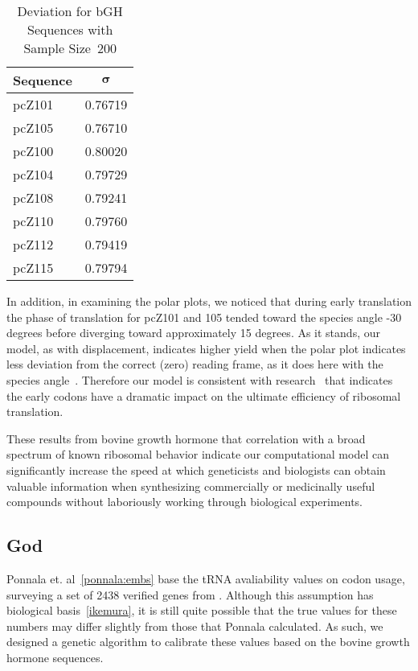 \documentclass[12pt, draft]{article}
\numberwithin{equation}{section}
\begin{document}
\begin{table}[tbp]
\begin{center}
    \begin{tabular}{lc}
        \toprule
        \textbf{Sequence} & $\mathbf{\sigma}$\\
        \midrule
        pcZ101 & 0.76719\\
        pcZ105 & 0.76710\\
        \midrule
        pcZ100 & 0.80020\\
        pcZ104 & 0.79729\\
        pcZ108 & 0.79241\\
        pcZ110 & 0.79760\\
        pcZ112 & 0.79419\\
        pcZ115 & 0.79794\\
        \bottomrule
    \end{tabular}
    \caption{Deviation for bGH Sequences with Sample Size~200}
    \label{bgh:deviation}
\end{center}
\end{table}

In addition, in examining the polar plots, we noticed that during
early translation the phase of translation for pcZ101 and 105 tended toward the species
angle -30 degrees before diverging toward approximately 15 degrees. As
it stands, our model, as with displacement, indicates higher yield when the polar plot
indicates less deviation from the correct (zero) reading frame, as it
does here with the species angle~\cite{lalit:mechanics}. Therefore our
model is consistent with research~\cite{bgh:initiation} that indicates
the early codons have a dramatic impact on the ultimate efficiency of
ribosomal translation.

These results from bovine growth hormone that correlation with a broad
spectrum of known ribosomal behavior indicate our computational model
can significantly increase the speed at which geneticists and
biologists can obtain valuable information when synthesizing
commercially or medicinally useful compounds without laboriously
working through biological experiments.

\subsection{God}
Ponnala et. al~\ref{ponnala:embs} base the tRNA avaliability values on codon usage, surveying a set of 2438 verified genes from \ecoli.
Although this assumption has biological basis~\ref{ikemura}, it is still quite possible that the true values for these numbers may differ 
slightly from those that Ponnala calculated.  As such, we designed a genetic algorithm to calibrate these values based on the bovine growth hormone sequences.
\end{document}
